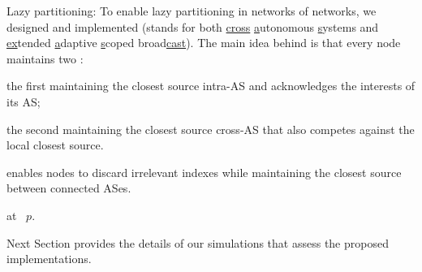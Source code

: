 \begin{asparadesc}
\item [Lazy partitioning:]
  To enable lazy partitioning in networks of networks, we designed and
  implemented \NAMEC (stands for both \underline{cross}
  \underline{a}utonomous \underline{s}ystems and \underline{ex}tended
  \underline{a}daptive \underline{s}coped broad\underline{cast}). The
  main idea behind \NAMEC is that every node maintains two \NAME:
  \begin{inparaenum}[(i)]
\item the first maintaining the closest source intra-AS and
  acknowledges the interests of its AS;
\item the second maintaining the closest source cross-AS that also
  competes against the local closest source.
\end{inparaenum}
\NAMEC enables nodes to discard irrelevant indexes while maintaining
the closest source between connected ASes. 

\end{asparadesc}


\begin{algorithm}
  
  \caption{\label{algo:xascast}\NAMEC at \Process~$p$. }
\end{algorithm}

Next Section provides the details of our simulations that assess the
proposed implementations.


